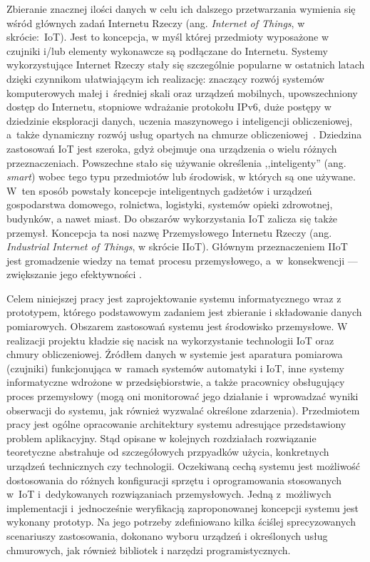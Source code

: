 \documentclass[a4paper, 12pt, twoside]{article}
\begin{document}
Zbieranie znacznej ilości danych w celu ich dalszego przetwarzania wymienia się
wśród głównych zadań Internetu Rzeczy (ang. \emph{Internet of Things}, w skrócie:~IoT).
Jest to koncepcja, w myśl której przedmioty wyposażone w czujniki i/lub elementy
wykonawcze są podłączane do Internetu. Systemy wykorzystujące Internet Rzeczy stały się szczególnie popularne
w ostatnich latach dzięki czynnikom ułatwiającym ich realizację:
znaczący rozwój systemów komputerowych małej i~średniej skali oraz urządzeń mobilnych, upowszechniony
dostęp do Internetu, stopniowe wdrażanie protokołu IPv6, duże postępy w dziedzinie
eksploracji danych, uczenia maszynowego i inteligencji obliczeniowej,
a~także dynamiczny rozwój usług opartych na chmurze obliczeniowej~\cite{intro-to-iot}.
Dziedzina zastosowań IoT jest szeroka, gdyż obejmuje ona urządzenia
o wielu różnych przeznaczeniach. Powszechne stało się używanie określenia ,,inteligenty''
(ang. \emph{smart}) wobec tego typu przedmiotów lub środowisk, w których są one używane.  W~ten sposób
powstały koncepcje inteligentnych gadżetów i urządzeń gospodarstwa domowego,
rolnictwa, logistyki, systemów opieki zdrowotnej, budynków, a nawet miast.
Do obszarów wykorzystania IoT zalicza się także przemysł. Koncepcja ta nosi
nazwę Przemysłowego Internetu Rzeczy (ang. \emph{Industrial Internet of Things}, w skrócie IIoT).
Głównym przeznaczeniem IIoT jest gromadzenie wiedzy na temat procesu przemysłowego,
a~w~konsekwencji --- zwiększanie jego efektywności \cite{iiot-challenges-opportunities-directions}.

Celem niniejszej pracy jest zaprojektowanie systemu informatycznego
wraz z prototypem, którego podstawowym zadaniem jest zbieranie i składowanie danych pomiarowych.
Obszarem zastosowań systemu jest środowisko przemysłowe.
W realizacji projektu kładzie się nacisk na wykorzystanie technologii IoT
oraz chmury obliczeniowej. Źródłem danych w systemie
jest aparatura pomiarowa (czujniki) funkcjonująca w~ramach systemów automatyki i IoT,
inne systemy informatyczne wdrożone w przedsiębiorstwie,
a także pracownicy obsługujący proces przemysłowy (mogą oni monitorować jego działanie
i~wprowadzać wyniki obserwacji do systemu, jak również wyzwalać określone zdarzenia).
Przedmiotem pracy jest ogólne opracowanie architektury
systemu adresujące przedstawiony problem aplikacyjny. Stąd opisane w kolejnych rozdziałach
rozwiązanie teoretyczne abstrahuje od szczegółowych przpyadków użycia, konkretnych urządzeń
technicznych czy technologii. Oczekiwaną cechą systemu jest możliwość dostosowania
do różnych konfiguracji sprzętu i oprogramowania stosowanych w~IoT i~dedykowanych
rozwiązaniach przemysłowych. Jedną z~możliwych implementacji i~jednocześnie weryfikacją
zaproponowanej koncepcji systemu jest wykonany prototyp. Na jego potrzeby zdefiniowano
kilka ściślej sprecyzowanych scenariuszy zastosowania, dokonano wyboru urządzeń
i określonych usług chmurowych, jak również bibliotek i narzędzi programistycznych.
\end{document}
